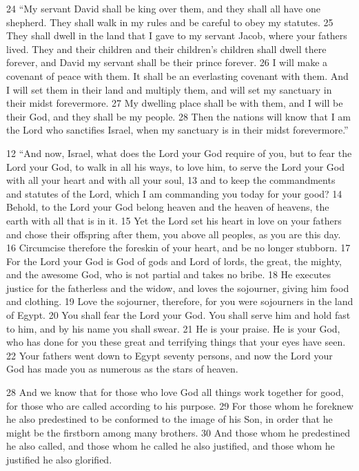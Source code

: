 \begin{bible}
24 ``My servant David shall be king over them, and they shall all have one shepherd. They shall walk in my rules and be careful to obey my statutes. 25 They shall dwell in the land that I gave to my servant Jacob, where your fathers lived. They and their children and their children's children shall dwell there forever, and David my servant shall be their prince forever. 26 I will make a covenant of peace with them. It shall be an everlasting covenant with them. And I will set them in their land and multiply them, and will set my sanctuary in their midst forevermore. 27 My dwelling place shall be with them, and I will be their God, and they shall be my people. 28 Then the nations will know that I am the Lord who sanctifies Israel, when my sanctuary is in their midst forevermore.'' 


12 ``And now, Israel, what does the Lord your God require of you, but to fear the Lord your God, to walk in all his ways, to love him, to serve the Lord your God with all your heart and with all your soul, 13 and to keep the commandments and statutes of the Lord, which I am commanding you today for your good? 14 Behold, to the Lord your God belong heaven and the heaven of heavens, the earth with all that is in it. 15 Yet the Lord set his heart in love on your fathers and chose their offspring after them, you above all peoples, as you are this day. 16 Circumcise therefore the foreskin of your heart, and be no longer stubborn. 17 For the Lord your God is God of gods and Lord of lords, the great, the mighty, and the awesome God, who is not partial and takes no bribe. 18 He executes justice for the fatherless and the widow, and loves the sojourner, giving him food and clothing. 19 Love the sojourner, therefore, for you were sojourners in the land of Egypt. 20 You shall fear the Lord your God. You shall serve him and hold fast to him, and by his name you shall swear. 21 He is your praise. He is your God, who has done for you these great and terrifying things that your eyes have seen. 22 Your fathers went down to Egypt seventy persons, and now the Lord your God has made you as numerous as the stars of heaven.


28 And we know that for those who love God all things work together for good, for those who are called according to his purpose. 29 For those whom he foreknew he also predestined to be conformed to the image of his Son, in order that he might be the firstborn among many brothers. 30 And those whom he predestined he also called, and those whom he called he also justified, and those whom he justified he also glorified.


\end{bible}
